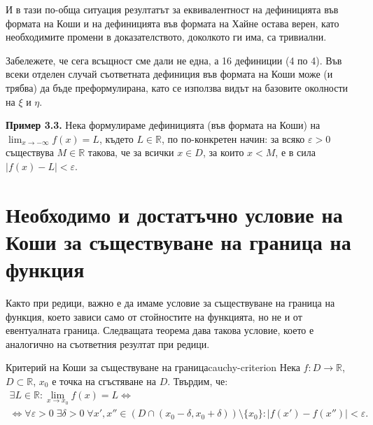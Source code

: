 И в тази по-обща ситуация резултатът за еквивалентност на дефиницията във формата на Коши и на дефиницията във формата на Хайне остава верен, като необходимите промени в доказателството, доколкото ги има, са тривиални.

Забележете, че сега всъщност сме дали не една, а 16 дефиниции (4 по 4). Във всеки отделен случай съответната дефиниция във формата на Коши може (и трябва) да бъде преформулирана, като се използва видът на базовите околности на $\xi$ и $\eta$.

\medskip
\noindent\textbf{Пример 3.3.} Нека формулираме дефиницията (във формата на Коши) на $\lim_{x \to -\infty} f(x) = L$, където $L \in \mathbb{R}$, по по-конкретен начин: за всяко $\varepsilon > 0$ съществува $M \in \mathbb{R}$ такова, че за всички $x \in D$, за които $x < M$, е в сила $|f(x) - L| < \varepsilon$.

\section{Необходимо и достатъчно условие на Коши за съществуване на граница на функция}

Както при редици, важно е да имаме условие за съществуване на граница на функция, което зависи само от стойностите на функцията, но не и от евентуалната граница. Следващата теорема дава такова условие, което е аналогично на съответния резултат при редици.

\begin{theorem}{Критерий на Коши за съществуване на граница}{cauchy-criterion}
Нека $f : D \to \mathbb{R}$, $D \subset \mathbb{R}$, $x_0$ е точка на сгъстяване на $D$. Твърдим, че:
\begin{align*}
\exists L \in \mathbb{R} : \lim_{x \to x_0} f(x) = L \iff \\
\iff \forall \varepsilon > 0 \; \exists \delta > 0 \; \forall x', x'' \in (D \cap (x_0 - \delta, x_0 + \delta)) \setminus \{x_0\} : |f(x') - f(x'')| < \varepsilon.
\end{align*}
\end{theorem}

